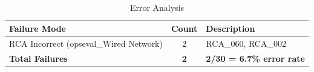 \begin{table}[h]
\centering
\caption{Error Analysis}
\label{tab:error-analysis}
\begin{tabular}{lcp{8cm}}
\toprule
\textbf{Failure Mode} & \textbf{Count} & \textbf{Description} \\
\midrule
RCA Incorrect (opseval_Wired Network) & 2 & RCA_060, RCA_002 \\
\midrule
\textbf{Total Failures} & \textbf{2} & \textbf{2/30 = 6.7\% error rate} \\
\bottomrule
\end{tabular}
\end{table}


